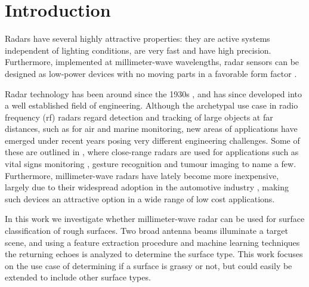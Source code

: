 \chapter{Introduction}

Radars have several highly attractive properties: they are active systems independent of lighting conditions, are very fast and have high precision. Furthermore, implemented at millimeter-wave wavelengths, radar sensors can be designed as low-power devices with no moving parts in a favorable form factor \citep{lien_gillian_karagozler_amihood_schwesig_olson_raja_poupyrev_2016}.

Radar technology has been around since the 1930s \citep{watson-watt_1945}, and has since developed into a well established field of engineering. Although the archetypal use case in radio frequency (\gls{rf}) radars regard detection and tracking of large objects at far distances, such as for air and marine monitoring, new areas of applications have emerged under recent years posing very different engineering challenges. Some of these are outlined in \citep{amin_2017}, where close-range radars are used for applications such as vital signs monitoring \citep{kuo_lin_yu_lo_lyu_chou_chuang_2016}, gesture recognition \citep{lien_gillian_karagozler_amihood_schwesig_olson_raja_poupyrev_2016} and tumour imaging \citep{klemm_gibbins_leendertz_horseman_preece_benjamin_craddock_2011} to name a few. Furthermore, millimeter-wave radars have lately become more inexpensive, largely due to their widespread adoption in the automotive industry \citep{frenzel_2018}, making such devices an attractive option in a wide range of low cost applications. %

In this work we investigate whether millimeter-wave radar can be used for surface classification of rough surfaces. Two broad antenna beams illuminate a target scene, and using a feature extraction procedure and machine learning techniques the returning echoes is analyzed to determine the surface type. This work focuses on the use case of determining if a surface is grassy or not, but could easily be extended to include other surface types.  

